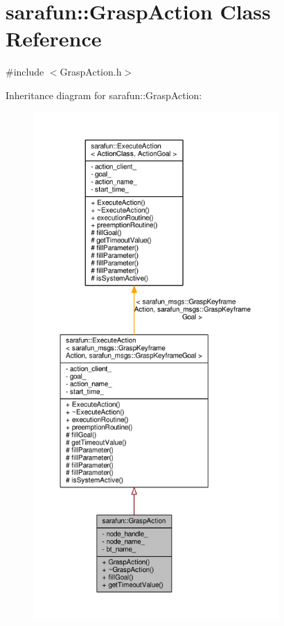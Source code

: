 \hypertarget{classsarafun_1_1GraspAction}{\section{sarafun\-:\-:Grasp\-Action Class Reference}
\label{classsarafun_1_1GraspAction}
}


{\ttfamily \#include $<$Grasp\-Action.\-h$>$}



Inheritance diagram for sarafun\-:\-:Grasp\-Action\-:
\nopagebreak
\begin{figure}[H]
\begin{center}
\leavevmode
\includegraphics[height=550pt]{de/d55/classsarafun_1_1GraspAction__inherit__graph}
\end{center}
\end{figure}


